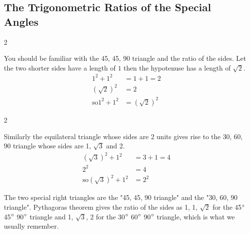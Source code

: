 \subsection{The Trigonometric Ratios of the Special Angles}
\columnsep =30pt
\begin {multicols}{2}
  
\setlength\fboxrule{0in}\setlength\fboxsep{0.2in}

You should be familiar with the 45, 45, 90 triangle and the ratio of the sides. Let
the two shorter sides have a length of $1$ then the hypotenuse has a length of $\sqrt{2}$. \\\relax
\begin{align*}1^{2} +1^{2} &  = 1 +1 =2 \\
\left (\sqrt{2}\right )^{2} &  = 2 \\
\text{so}1^{2} +1^{2} &  = \left (\sqrt{2}\right )^{2}\end{align*}


\end {multicols}



\columnsep =30pt
\begin {multicols}{2}
 

\setlength\fboxrule{0in}\setlength\fboxsep{0.2in}


Similarly the equilateral triangle whose sides are 2 units gives rise to the 30, 60, 90 triangle whose sides are 1, $\sqrt{3}$ and 2. \\\relax
\begin{align*}\left (\sqrt{3}\right )^{2} +1^{2} &  =  3 +1 =4 \\
2^{2} &  =  4 \\
\text{so}\left (\sqrt{3}\right )^{2} +1^{2} &  =  2^{2}\end{align*}


\end {multicols}


The two special right triangles are the "45, 45, 90 triangle" and the "30, 60, 90 triangle". Pythagoras
theorem gives the ratio of the sides as 1, 1, $\sqrt{2}$ for the 45$\mbox{{\ensuremath{{}^\circ}}}$ 45$\mbox{{\ensuremath{{}^\circ}}}$ 90$\mbox{{\ensuremath{{}^\circ}}}$ triangle and 1, $\sqrt{3}\text{,}$ 2 for the 30$\mbox{{\ensuremath{{}^\circ}}}$ 60$\mbox{{\ensuremath{{}^\circ}}}$ 90$\mbox{{\ensuremath{{}^\circ}}}$ triangle, which is what we usually remember. 

